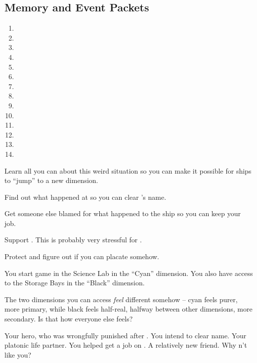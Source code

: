 \documentclass[char]{TMFHope}
\begin{document}
\subsection*{Memory and Event Packets}
\begin{enumerate}
	\item \mPractice{\MYname}
	\item \mAlpha{\MYname}
	\item \mNavOne{\MYname}
	\item \mNavTwo{\MYname}
	\item \mNavThree{\MYname}
	\item \mNavFour{\MYname}
	\item \mNavFive{\MYname}
	\item \mBroom{\MYname}
	\item \mLab{\MYname}
	\item \mPatient{\MYname}
	\item \mKitchen{\MYname}
	\item \mWeight{\MYname}
	\item \mTheater{\MYname}
	\item \mCrates{\MYname}
\end{enumerate}

\begin{itemz}[Goals]
	\item Learn all you can about this weird situation so you can make it possible for ships to ``jump'' to a new dimension.
	\item Find out what happened at \pBattle{} so you can clear \cCap{}'s name.
	\item Get someone else blamed for what happened to the ship so you can keep your job.
	\item Support \cWeap{}. This is probably very stressful for \cWeap{\them}.
	\item Protect \cBoy{} and figure out if you can placate \cEng{} somehow.
\end{itemz}

\begin{itemz}[Notes]
	\item You start game in the Science Lab in the ``Cyan'' dimension. You also have access to the Storage Bays in the ``Black'' dimension.
	\item The two dimensions you can access {\em feel} different somehow -- cyan feels purer, more primary, while black feels half-real, halfway between other dimensions, more secondary.  Is that how everyone else feels?
\end{itemz}

\begin{contacts}
	\contact{\cCap{}} Your hero, who was wrongfully punished after \pBattle{}. You intend to clear \cCap{\their} name.
	\contact{\cBoy{}} Your platonic life partner. You helped get \cBoy{\them} a job on \pNew{}.
	\contact{\cWeap{}} A relatively new friend.
	\contact{\cEng{}} Why \cEng{\does}n't \cEng{\they} like you?
\end{contacts}
\end{document}

